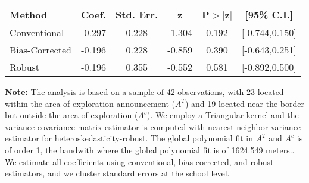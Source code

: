 \begin{table}[htbp]\centering
 \footnotesize 
\begin{tabular}{lccccc}
\hline\hline
Method & Coef. & Std. Err. & z & P$>|$z$|$ & [95\% C.I.] \\ 
\hline \hline  
Conventional & -0.297 & 0.228 & -1.304 & 0.192 & [-0.744,0.150] \\ 
 Bias-Corrected & -0.196 & 0.228 & -0.859 & 0.390 & [-0.643,0.251] \\ 
Robust & -0.196 & 0.355 & -0.552 & 0.581 & [-0.892,0.500] \\ 
  \hline\hline
\end{tabular}
\label{table:rd}
\begin{tablenotes} 
  \justifying \tiny \textbf{Note: }    
   The analysis is based on a sample of 42 observations, with 23 located within the area of exploration announcement ($A^{T}$) and 19 located near the border but outside the area of exploration  ($A^{c}$). 
           We employ a Triangular kernel and the variance-covariance matrix estimator is computed with nearest neighbor variance estimator for heteroskedasticity-robust. The global polynomial fit in  $A^{T}$ and $A^{c}$ is of order 1, the bandwith where the global polynomial fit is of 1624.549 meters.. We estimate all coefficients using conventional, bias-corrected, and robust estimators, and we cluster standard errors at the school level. \end{tablenotes} 
 \end{table} 
